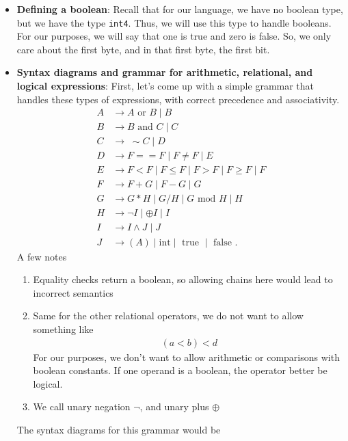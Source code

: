 \documentclass{report}
\begin{document}
\begin{itemize}
        \bigbreak \noindent 
    \item \textbf{Defining a boolean}: Recall that for our language, we have no boolean type, but we have the type \texttt{int4}. Thus, we will use this type to handle booleans. For our purposes, we will say that one is true and zero is false. So, we only care about the first byte, and in that first byte, the first bit.
    \item \textbf{Syntax diagrams and grammar for arithmetic, relational, and logical expressions}: First, let's come up with a simple grammar that handles these types of expressions, with correct precedence and associativity.
        \begin{align*}
            A &\to A \text{ or } B \mid B\\
            B &\to B \text{ and } C \mid C\\
            C &\to\; \sim C \mid D \\
            D &\to F == F \mid F \ne F \mid E\\
            E &\to F < F \mid F \leq F \mid F > F \mid F \geq F \mid F \\
            F &\to F + G \mid F - G \mid G\\
            G &\to G * H \mid G / H \mid G \text{ mod } H \mid H\\
            H &\to \neg I \mid \oplus I \mid I\\
            I &\to I \land J \mid J\\
            J &\to (A) \mid \text{int} \mid \text{ true } \mid \text{ false }
        .\end{align*}
        A few notes
        \begin{enumerate}
            \item Equality checks return a boolean, so allowing chains here would lead to incorrect semantics
            \item Same for the other relational operators, we do not want to allow something like
                \begin{align*}
                    (a < b) < d
                \end{align*}
                For our purposes, we don't want to allow arithmetic or comparisons with boolean constants. If one operand is a boolean, the operator better be logical. 
            \item We call unary negation $\neg$, and unary plus $\oplus$
        \end{enumerate}
        The syntax diagrams for this grammar would be 

\end{itemize}
\end{document}
